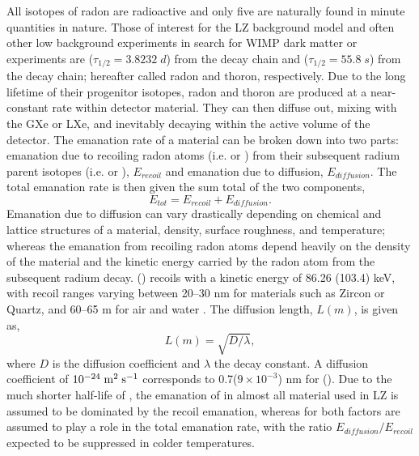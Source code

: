 All isotopes of radon are radioactive and only five are naturally found in minute quantities in nature. Those of interest for the LZ background model and often other low background experiments in search for WIMP dark matter or \neutrinolessDoubleBeta{} experiments are \RnTTT{} ($\tau_{1/2}=3.8232 \; d$) from the \UTTE{} decay chain and \RnTTZ{} ($\tau_{1/2}=55.8 \; s$) from the \ThTTT{} decay chain; hereafter called radon and thoron, respectively. Due to the long lifetime of their progenitor isotopes, radon and thoron are produced at a near-constant rate within detector material. They can then diffuse out, mixing with the GXe or LXe, and inevitably decaying within the active volume of the detector. The emanation rate of a material can be broken down into two parts: emanation due to recoiling radon atoms (i.e. \RnTTT{} or \RnTTZ{}) from their subsequent radium parent isotopes (i.e. \RaTTF{} or \RaTTS{}), $E_{recoil}$ and emanation due to diffusion, $E_{diffusion}$. The total emanation rate is then given the sum total of the two components,
%
\begin{equation}
    E_{tot} = E_{recoil} + E_{diffusion}.
    \label{eq:radon_emanation}
\end{equation}
%
Emanation due to diffusion can vary drastically depending on chemical and lattice structures of a material, density, surface roughness, and temperature; whereas the emanation from recoiling radon atoms depend heavily on the density of the material and the kinetic energy carried by the radon atom from the subsequent radium decay. \RnTTT{} (\RnTTZ{}) recoils with a kinetic energy of 86.26 (103.4) keV, with recoil ranges varying between 20--30 nm for materials such as Zircon or Quartz, and 60--65 \micro{}m for air and water \cite{radon_emanation_modeling}. The diffusion length, $L(m)$, is given as, 
%
\begin{equation}
    L(m) = \sqrt{D/\lambda},
    \label{eq:radon_emanation_diffusion}
\end{equation}
%
where $D$ is the diffusion coefficient and $\lambda{}$ the decay constant. A diffusion coefficient of $10^{-24} \; \text{m}^2 \; \text{s}^{-1}$ corresponds to  0.7($9 \times{} 10^{-3}$) nm for \RnTTT{} (\RnTTZ{}). Due to the much shorter half-life of \RnTTZ{}, the emanation of \RnTTZ{} in almost all material used in LZ is assumed to be dominated by the recoil emanation, whereas for \RnTTT{} both factors are assumed to play a role in the total emanation rate, with the ratio $E_{diffusion}/E_{recoil}$ expected to be suppressed in colder temperatures. 



